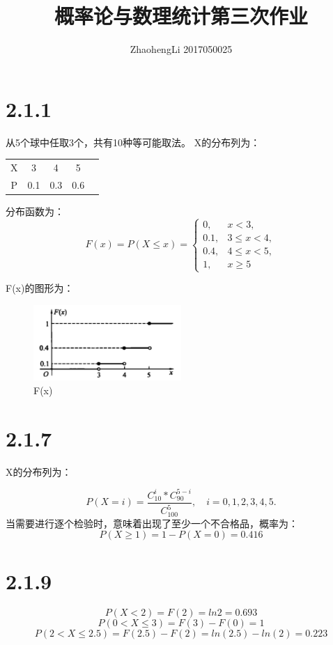 \documentclass{article}
\title{概率论与数理统计第三次作业}
\author{ZhaohengLi 2017050025}
\begin{document}
\maketitle
\section{2.1.1}
从5个球中任取3个，共有10种等可能取法。
X的分布列为：
\begin{table}[H]
\centering
\begin{tabular}{lllll}


\multicolumn{1}{c}{X} & \multicolumn{1}{c}{3}   & \multicolumn{1}{c}{4}   & \multicolumn{1}{c}{5}   &  \\

\multicolumn{1}{c}{P} & \multicolumn{1}{c}{0.1} & \multicolumn{1}{c}{0.3} & \multicolumn{1}{c}{0.6} &  \\
\end{tabular}
\end{table}
分布函数为：
\begin{equation}
F(x)=P(X\leq x)=
\begin{cases}
0, &x<3,\\
0.1, &3\leq x < 4,\\
0.4, &4\leq x < 5,\\
1, &x\geq 5
\end{cases}
\end{equation}

F(x)的图形为：

\begin{figure}[H]
    \centering
    \includegraphics[width=0.5\textwidth]{pic1.png}
    \caption{F(x)}
\end{figure}

\section{2.1.7}
X的分布列为：

$$P(X=i)=\frac{C^i_{10}*C^{5-i}_{90}}{C_{100}^5},\quad i = 0,1,2,3,4,5.$$
当需要进行逐个检验时，意味着出现了至少一个不合格品，概率为：
$$P(X\geq 1)=1-P(X=0)=0.416$$
\section{2.1.9}
$$P(X<2)=F(2)=ln2=0.693$$
$$P(0<X\leq 3)=F(3)-F(0)=1$$
$$P(2<X\leq 2.5)=F(2.5)-F(2)=ln(2.5)-ln(2)=0.223$$
\end{document}
